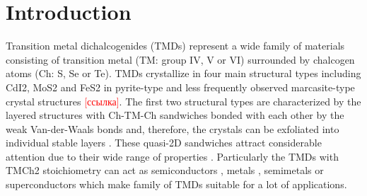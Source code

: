 \documentclass[a4paperm]{article}
\begin{document}
\section*{Introduction}
Transition metal dichalcogenides (TMDs) represent a wide family of materials consisting of transition metal (TM: group IV, V or VI) surrounded by chalcogen atoms (Ch: S, Se or Te). TMDs crystallize in four main structural types including CdI2, MoS2 and FeS2 in pyrite-type and less frequently observed marcasite-type crystal structures \textcolor{red}{[ссылка]}.
The first two structural types are characterized by the layered structures with Ch-TM-Ch sandwiches bonded with each other by the weak Van-der-Waals bonds and, therefore, the crystals can be exfoliated into individual stable layers \cite{zhang2020intercalation}. These quasi-2D sandwiches attract considerable attention due to their wide range of properties \cite{li2017graphene, SHI20181, xi2016ising, hu2019recent, pi2019recent}. Particularly the TMDs with TMCh2 stoichiometry can act as semiconductors \cite{nayeri2018transport}, metals \cite{zhao20212d}, semimetals \cite{xu2020high, zhao2020observation} or superconductors \cite{wang2020nodeless,hsu2017topological} which make family of TMDs suitable for a lot of applications. 
\end{document}
